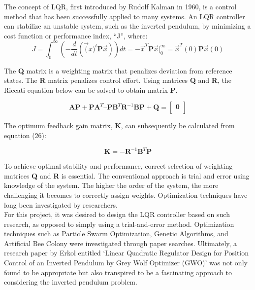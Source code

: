 \documentclass[titlepage]{article}
\begin{document}
The concept of LQR, first introduced by Rudolf Kalman in 1960, is a control method that has been successfully applied to many systems. An LQR controller can stabilize an unstable system, such as the inverted pendulum, by minimizing a cost function or performance index, “J”, where:
\begin{equation}
J = \int_{0}^{\infty} \left( -\frac{d}{dt}\left(\vec(x)^{t}\textbf{P}\vec{x}\right)\right)dt = -\vec{x}^{T}\textbf{P}\vec{x}\biggr\rvert_{0}^{\infty}=\vec{x}^{T}\left(0\right)\textbf{P}\vec{x}\left(0\right)
\end{equation}

The \textbf{Q} matrix is a weighting matrix that penalizes deviation from reference states. The \textbf{R} matrix penalizes control effort. Using matrices \textbf{Q} and \textbf{R}, the Riccati equation below can be solved to obtain matrix \textbf{P}.

\begin{equation}
\textbf{A}\textbf{P} + \textbf{P}\textbf{A}^{T} – \textbf{P}\textbf{B}^{T}\textbf{R}^{-1}\textbf{B}\textbf{P} + \textbf{Q} = \begin{bmatrix} \textbf{0}\\\end{bmatrix}
\end{equation}

The optimum feedback gain matrix, \textbf{K}, can subsequently be calculated from equation (26):

\begin{equation}
\textbf{K} = -\textbf{R}^{-1}\textbf{B}^{T}\textbf{P}
\end{equation}

To achieve optimal stability and performance, correct selection of weighting matrices \textbf{Q} and \textbf{R} is essential. The conventional approach is trial and error using knowledge of the system. The higher the order of the system, the more challenging it becomes to correctly assign weights. Optimization techniques have long been investigated by researchers.\\

For this project, it was desired to design the LQR controller based on such research, as opposed to simply using a trial-and-error method. Optimization techniques such as Particle Swarm Optimization, Genetic Algorithms, and Artificial Bee Colony were investigated through paper searches. Ultimately, a research paper by Erkol entitled ‘Linear Quadratic Regulator Design for Position Control of an Inverted Pendulum by Grey Wolf Optimizer (GWO)’ was not only found to be appropriate but also transpired to be a fascinating approach to considering the inverted pendulum problem.\\
\end{document}
